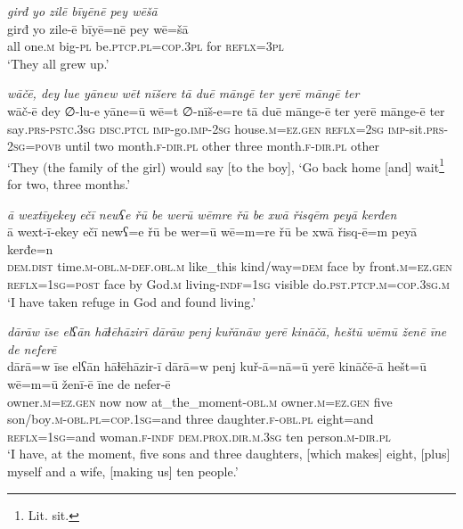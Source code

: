 \ea \label{ŽE.68}
\textit{girđ yo zilē bīyēnē pey wēšā} \\ 
\gll girđ yo zile-ē bīyē=nē pey wē=šā \\ 
 all one\textsc{.m} big\textsc{\textsc{-pl}} be\textsc{.ptcp}\textsc{.pl}\textsc{=cop}\textsc{.3pl} for \textsc{reflx}\textsc{=3pl} \\ 
\glt `They all grew up.'
\z 
 
\ea \label{ŽE.82}
\textit{wāčē, dey lue yānew wēt nīšere tā duē māngē ter yerē māngē ter} \\ 
\gll wāč-ē dey ∅-lu-e yāne=ū wē=t ∅-nīš-e=re tā duē mānge-ē ter yerē mānge-ē ter \\ 
 say\textsc{.prs-pstc}\textsc{.3sg} \textsc{disc}.\textsc{ptcl} \textsc{imp-}go.\textsc{imp-}\textsc{2sg} house\textsc{.m}\textsc{\textsc{=ez.gen}} \textsc{reflx}\textsc{=\textsc{2sg}} \textsc{imp-}sit\textsc{.prs}-\textsc{2sg}\textsc{=\textsc{povb}} until two month\textsc{.f}\textsc{-dir}\textsc{.pl} other three month\textsc{.f}\textsc{-dir}\textsc{.pl} other \\ 
\glt `They (the family of the girl) would say [to the boy], ‘Go back home [and] wait\footnote{Lit. sit.} for two, three months.'
\z 
 
\ea \label{ŽM.15}
\textit{ā wextīyekey ečī newʕe řū be werū wēmre řū be xwā řisqēm peyā kerđen} \\ 
\gll ā wext-ī-ekey ečī newʕ=e řū be wer=ū wē=m=re řū be xwā řisq-ē=m peyā kerđe=n \\ 
 \textsc{dem.dist} time\textsc{.m}\textsc{-obl}\textsc{.m}\textsc{-def}\textsc{.obl}\textsc{.m} like\_this kind/way\textsc{=dem} face by front\textsc{.m}\textsc{=ez.gen} \textsc{reflx}\textsc{=\textsc{1sg}}\textsc{=\textsc{post}} face by God\textsc{.m} living\textsc{-indf}\textsc{=\textsc{1sg}} visible do\textsc{.pst}\textsc{.ptcp}\textsc{.m}\textsc{=cop}\textsc{.3sg}\textsc{.m} \\ 
\glt `I have taken refuge in God and found living.'
\z 
 
\ea \label{ŽM.16}
\textit{dārāw īse elʕān hāɫēhāzirī dārāw penj kuřānāw yerē kināčā, heštū wēmū ženē īne de neferē} \\ 
\gll dārā=w īse elʕān hāɫēhāzir-ī dārā=w penj kuř-ā=nā=ū yerē kināčē-ā hešt=ū wē=m=ū ženī-ē īne de nefer-ē \\ 
 owner\textsc{.m}\textsc{=ez.gen} now now at\_the\_moment\textsc{-obl}\textsc{.m} owner\textsc{.m}\textsc{=ez.gen} five son/boy\textsc{.m}\textsc{-obl}\textsc{.pl}\textsc{=cop}\textsc{.\textsc{1sg}}=and three daughter\textsc{.f}\textsc{-obl}\textsc{.pl} eight=and \textsc{reflx}\textsc{=\textsc{1sg}}=and woman\textsc{.f}\textsc{-indf} \textsc{dem.prox}\textsc{.dir}\textsc{.m}\textsc{.3sg} ten person\textsc{.m}\textsc{-dir}\textsc{.pl} \\ 
\glt `I have, at the moment, five sons and three daughters, [which makes] eight, [plus] myself and a wife, [making us] ten people.'
\z 
 
